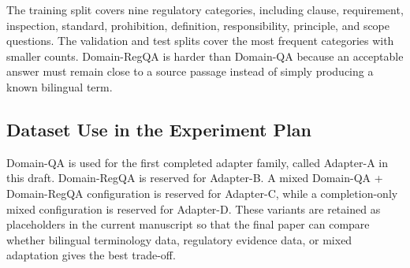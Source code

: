 The training split covers nine regulatory categories, including clause,
requirement, inspection, standard, prohibition, definition, responsibility,
principle, and scope questions. The validation and test splits cover the most
frequent categories with smaller counts. Domain-RegQA is harder than
Domain-QA because an acceptable answer must remain close to a source passage
instead of simply producing a known bilingual term.

\subsection{Dataset Use in the Experiment Plan}

Domain-QA is used for the first completed adapter family, called Adapter-A in
this draft. Domain-RegQA is reserved for Adapter-B. A mixed Domain-QA +
Domain-RegQA configuration is reserved for Adapter-C, while a completion-only
mixed configuration is reserved for Adapter-D. These variants are retained as
placeholders in the current manuscript so that the final paper can compare
whether bilingual terminology data, regulatory evidence data, or mixed
adaptation gives the best trade-off.
